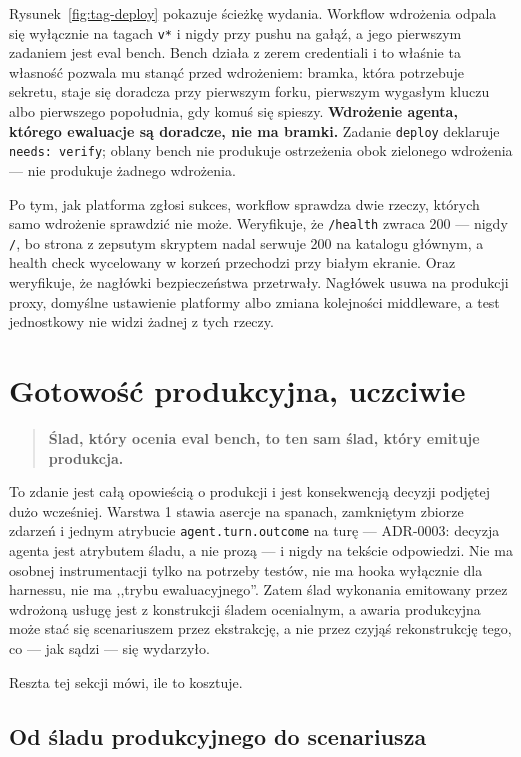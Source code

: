 \documentclass[11pt,a4paper]{article}
\newcommand{\finding}[1]{{\color{primaryblue}\textbf{#1}}}
\begin{document}
Rysunek~\ref{fig:tag-deploy} pokazuje ścieżkę wydania. Workflow wdrożenia odpala się wyłącznie na tagach \texttt{v*} i nigdy przy pushu na gałąź, a jego pierwszym zadaniem jest eval bench. Bench działa z zerem credentiali i to właśnie ta własność pozwala mu stanąć przed wdrożeniem: bramka, która potrzebuje sekretu, staje się doradcza przy pierwszym forku, pierwszym wygasłym kluczu albo pierwszego popołudnia, gdy komuś się spieszy. \finding{Wdrożenie agenta, którego ewaluacje są doradcze, nie ma bramki.} Zadanie \texttt{deploy} deklaruje \texttt{needs: verify}; oblany bench nie produkuje ostrzeżenia obok zielonego wdrożenia --- nie produkuje żadnego wdrożenia.

Po tym, jak platforma zgłosi sukces, workflow sprawdza dwie rzeczy, których samo wdrożenie sprawdzić nie może. Weryfikuje, że \texttt{/health} zwraca 200 --- nigdy \texttt{/}, bo strona z zepsutym skryptem nadal serwuje 200 na katalogu głównym, a health check wycelowany w korzeń przechodzi przy białym ekranie. Oraz weryfikuje, że nagłówki bezpieczeństwa przetrwały. Nagłówek usuwa na produkcji proxy, domyślne ustawienie platformy albo zmiana kolejności middleware, a test jednostkowy nie widzi żadnej z tych rzeczy.

\section{Gotowość produkcyjna, uczciwie}

\begin{quote}
\textbf{Ślad, który ocenia eval bench, to ten sam ślad, który emituje produkcja.}
\end{quote}

To zdanie jest całą opowieścią o produkcji i jest konsekwencją decyzji podjętej dużo wcześniej. Warstwa 1 stawia asercje na spanach, zamkniętym zbiorze zdarzeń i jednym atrybucie \texttt{agent.turn.outcome} na turę --- ADR-0003: decyzja agenta jest atrybutem śladu, a nie prozą --- i nigdy na tekście odpowiedzi. Nie ma osobnej instrumentacji tylko na potrzeby testów, nie ma hooka wyłącznie dla harnessu, nie ma ,,trybu ewaluacyjnego''. Zatem ślad wykonania emitowany przez wdrożoną usługę jest z konstrukcji śladem ocenialnym, a awaria produkcyjna może stać się scenariuszem przez ekstrakcję, a nie przez czyjąś rekonstrukcję tego, co --- jak sądzi --- się wydarzyło.

Reszta tej sekcji mówi, ile to kosztuje.

\subsection{Od śladu produkcyjnego do scenariusza}
\label{sec:extraction}
\end{document}
